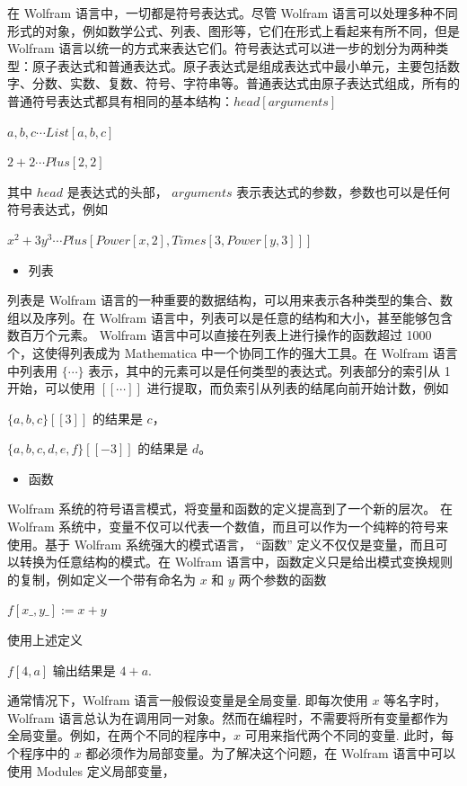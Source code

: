 在 Wolfram 语言中，一切都是符号表达式。尽管 Wolfram 语言可以处理多种不同形式的对象，例如数学公式、列表、图形等，它们在形式上看起来有所不同，但是 Wolfram 语言以统一的方式来表达它们。符号表达式可以进一步的划分为两种类型：原子表达式和普通表达式。原子表达式是组成表达式中最小单元，主要包括数字、分数、实数、复数、符号、字符串等。普通表达式由原子表达式组成，所有的普通符号表达式都具有相同的基本结构：$head[arguments]$

${a, b, c} \cdots List[a, b, c]$

$2 + 2 \cdots Plus[2, 2]$

其中 $head$ 是表达式的头部， $arguments$ 表示表达式的参数，参数也可以是任何符号表达式，例如

$x^2 + 3y^3 \cdots Plus[Power[x, 2], Times[3, Power[y, 3]]]$

\begin{itemize}
   \item 列表
\end{itemize}

列表是 Wolfram 语言的一种重要的数据结构，可以用来表示各种类型的集合、数组以及序列。在 Wolfram 语言中，列表可以是任意的结构和大小，甚至能够包含数百万个元素。 Wolfram 语言中可以直接在列表上进行操作的函数超过 1000 个，这使得列表成为 Mathematica 中一个协同工作的强大工具。在 Wolfram 语言中列表用 $\{\cdots\}$ 表示，其中的元素可以是任何类型的表达式。列表部分的索引从 1 开始，可以使用 $[[\cdots]]$ 进行提取，而负索引从列表的结尾向前开始计数，例如

$\{a, b, c\}[[3]]$ 的结果是 $c$，

$\{a, b, c, d, e, f\}[[-3]]$ 的结果是 $d$。

\begin{itemize}
    \item 函数
\end{itemize}

Wolfram 系统的符号语言模式，将变量和函数的定义提高到了一个新的层次。 在 Wolfram 系统中，变量不仅可以代表一个数值，而且可以作为一个纯粹的符号来使用。基于 Wolfram 系统强大的模式语言， “函数” 定义不仅仅是变量，而且可以转换为任意结构的模式。在 Wolfram 语言中，函数定义只是给出模式变换规则的复制，例如定义一个带有命名为 $x$ 和 $y$ 两个参数的函数

$f[x\_ , y\_ ]:= x + y$

使用上述定义

$f[4, a]$ 输出结果是 $4 + a$.

通常情况下，Wolfram 语言一般假设变量是全局变量. 即每次使用  $x$ 等名字时，Wolfram 语言总认为在调用同一对象。然而在编程时，不需要将所有变量都作为全局变量。例如，在两个不同的程序中，$x$ 可用来指代两个不同的变量. 此时，每个程序中的 $x$ 都必须作为局部变量。为了解决这个问题，在 Wolfram 语言中可以使用  Modules 定义局部变量，

